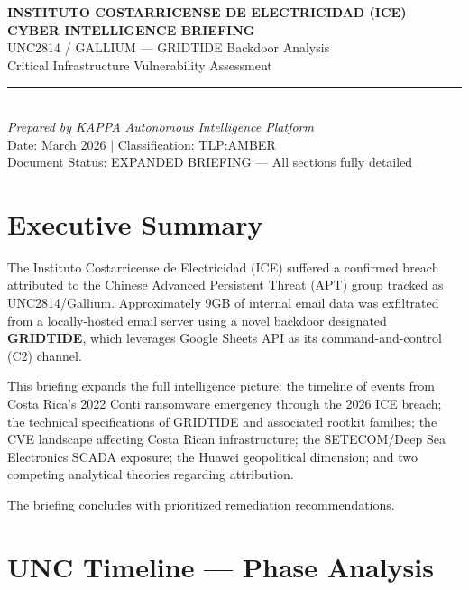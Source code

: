 \documentclass[11pt,a4paper]{article}
\begin{document}
\begin{center}
{\Large\bfseries\color{darkblue} INSTITUTO COSTARRICENSE DE ELECTRICIDAD (ICE)}\\[4pt]
{\Large\bfseries CYBER INTELLIGENCE BRIEFING}\\[12pt]
{\large UNC2814 / GALLIUM --- GRIDTIDE Backdoor Analysis}\\
{\large Critical Infrastructure Vulnerability Assessment}\\[8pt]
\rule{0.8\textwidth}{0.5pt}\\[8pt]
{\normalsize\textit{Prepared by KAPPA Autonomous Intelligence Platform}}\\
{\normalsize Date: March 2026 \quad | \quad Classification: TLP:AMBER}\\[4pt]
{\small Document Status: EXPANDED BRIEFING --- All sections fully detailed}
\end{center}

\vspace{12pt}

\tableofcontents
\newpage

\section{Executive Summary}

The Instituto Costarricense de Electricidad (ICE) suffered a confirmed breach attributed to the Chinese Advanced Persistent Threat (APT) group tracked as UNC2814/Gallium. Approximately 9GB of internal email data was exfiltrated from a locally-hosted email server using a novel backdoor designated \textbf{GRIDTIDE}, which leverages Google Sheets API as its command-and-control (C2) channel.

This briefing expands the full intelligence picture: the timeline of events from Costa Rica's 2022 Conti ransomware emergency through the 2026 ICE breach; the technical specifications of GRIDTIDE and associated rootkit families; the CVE landscape affecting Costa Rican infrastructure; the SETECOM/Deep Sea Electronics SCADA exposure; the Huawei geopolitical dimension; and two competing analytical theories regarding attribution.

The briefing concludes with prioritized remediation recommendations.

\section{UNC Timeline --- Phase Analysis}
\end{document}
